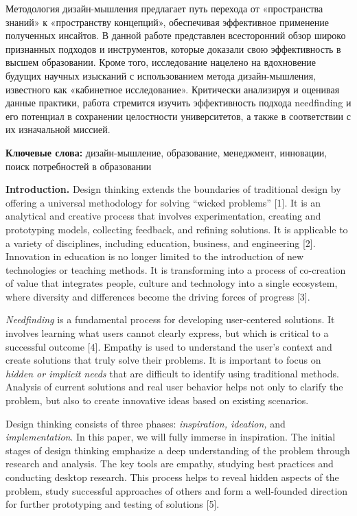 Методология дизайн-мышления предлагает путь перехода от «пространства
знаний» к «пространству концепций», обеспечивая эффективное применение
полученных инсайтов. В данной работе представлен всесторонний обзор
широко признанных подходов и инструментов, которые доказали свою
эффективность в высшем образовании. Кроме того, исследование нацелено на
вдохновение будущих научных изысканий с использованием метода
дизайн-мышления, известного как «кабинетное исследование». Критически
анализируя и оценивая данные практики, работа стремится изучить
эффективность подхода needfinding и его потенциал в сохранении
целостности университетов, а также в соответствии с их изначальной
миссией.

{\bfseries Ключевые слова:} дизайн-мышление, образование, менеджмент,
инновации, поиск потребностей в образовании

{\bfseries Introduction.} Design thinking extends the boundaries of
traditional design by offering a universal methodology for solving
``wicked problems'' {[}1{]}. It is an analytical and creative process
that involves experimentation, creating and prototyping models,
collecting feedback, and refining solutions. It is applicable to a
variety of disciplines, including education, business, and engineering
{[}2{]}. Innovation in education is no longer limited to the
introduction of new technologies or teaching methods. It is transforming
into a process of co-creation of value that integrates people, culture
and technology into a single ecosystem, where diversity and differences
become the driving forces of progress {[}3{]}.

\emph{Needfinding} is a fundamental process for developing user-centered
solutions. It involves learning what users cannot clearly express, but
which is critical to a successful outcome {[}4{]}. Empathy is used to
understand the user's context and create solutions that truly solve
their problems. It is important to focus on \emph{hidden or implicit
needs} that are difficult to identify using traditional methods.
Analysis of current solutions and real user behavior helps not only to
clarify the problem, but also to create innovative ideas based on
existing scenarios.

Design thinking consists of three phases: \emph{inspiration, ideation,}
and \emph{implementation}. In this paper, we will fully immerse in
inspiration. The initial stages of design thinking emphasize a deep
understanding of the problem through research and analysis. The key
tools are empathy, studying best practices and conducting desktop
research. This process helps to reveal hidden aspects of the problem,
study successful approaches of others and form a well-founded direction
for further prototyping and testing of solutions {[}5{]}.

